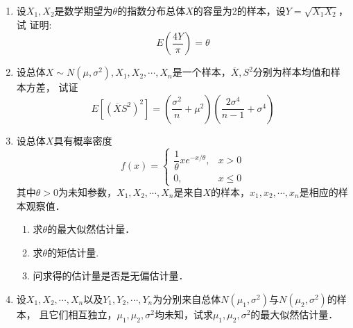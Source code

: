 \documentclass[10pt,a4paper]{article}
\begin{document}
    
\begin{enumerate}


    \item 设$X_1,X_2$是数学期望为$\theta$的指数分布总体$X$的容量为2的样本，设$Y=\sqrt{X_1X_2}$，试
    证明:
    $$E(\frac{4Y}{\pi})=\theta$$





    \item 设总体$X\sim N(\mu,\sigma^2),X_1,X_2,\cdots,X_n$是一个样本，$\overline{X},S^2$分别为样本均值和样本方差，
    试证
    $$E[(\overline{X}S^2)^2]=\left(\frac{\sigma^2}{n}+\mu^2\right)\left(\frac{2\sigma^4}{n-1}+\sigma^4\right)$$







    \item 设总体$X$具有概率密度
    $$f(x)=\left\{\begin{array}{ll}
        \dfrac{1}{\theta}xe^{-x/\theta}, & x>0\\
        0, & x\leq 0
    \end{array}\right.$$
    其中$\theta>0$为未知参数，$X_1,X_2,\cdots,X_n$是来自$X$的样本，$x_1,x_2,\cdots,x_n$是相应的样本观察值．
    \begin{enumerate}
        \item 求$\theta$的最大似然估计量．
        \item 求$\theta$的矩估计量.
        \item 问求得的估计量是否是无偏估计量．
    \end{enumerate}




    \item 设$X_1,X_2,\cdots,X_n$以及$Y_1,Y_2,\cdots,Y_n$为分别来自总体$N(\mu_1,\sigma^2)$与$N(\mu_2,\sigma^2)$的样本，
    且它们相互独立，$\mu_1,\mu_2,\sigma^2$均未知，试求$\mu_1,\mu_2,\sigma^2$的最大似然估计量．





\end{enumerate}
\end{document}
